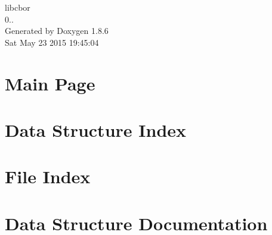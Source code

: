 \documentclass[twoside]{book}
\newcommand{\clearemptydoublepage}{%
  \newpage{\pagestyle{empty}\cleardoublepage}%
}
\begin{document}
\hypersetup{pageanchor=false}
\begin{titlepage}
\vspace*{7cm}
\begin{center}%
{\Large libcbor \\[1ex]\large 0.. }\\
\vspace*{1cm}
{\large Generated by Doxygen 1.8.6}\\
\vspace*{0.5cm}
{\small Sat May 23 2015 19:45:04}\\
\end{center}
\end{titlepage}
\clearemptydoublepage
\tableofcontents
\clearemptydoublepage
{}
\hypersetup{pageanchor=true}

\chapter{Main Page}
\label{index}\hypertarget{index}{}
\chapter{Data Structure Index}

\chapter{File Index}

\chapter{Data Structure Documentation}





















\end{document}

